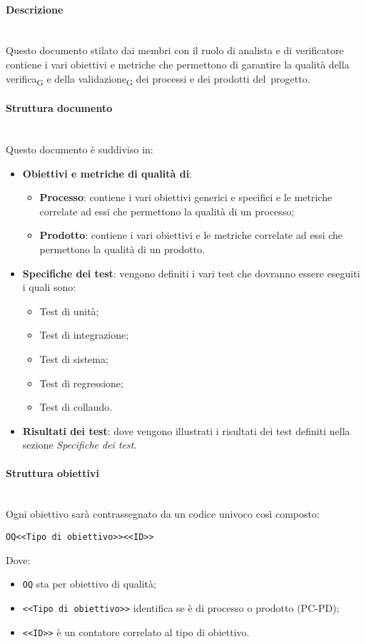 \paragraph {Descrizione}\mbox{}\\
Questo documento stilato dai membri con il ruolo di analista e di verificatore contiene i vari obiettivi e metriche che permettono di garantire la qualità della verifica\textsubscript{G} e della validazione\textsubscript{G} dei processi e dei prodotti del progetto.
\paragraph {Struttura documento}\mbox{}\\
Questo documento è suddiviso in:
\begin{itemize}
	\item \textbf{Obiettivi e metriche di qualità di}:
	\begin{itemize}
		\item \textbf{Processo}: contiene i vari obiettivi generici e specifici e le metriche correlate ad essi che permettono la qualità di un processo;
		\item \textbf{Prodotto}: contiene i vari obiettivi e le metriche correlate ad essi che permettono la qualità di un prodotto.
	\end{itemize}
	\item \textbf{Specifiche dei test}: vengono definiti i vari test che dovranno essere eseguiti i quali sono:
	\begin{itemize}
		\item Test di unità;
		\item Test di integrazione;
		\item Test di sistema;
		\item Test di regressione;
		\item Test di collaudo.
	\end{itemize}
	\item \textbf{Risultati dei test}: dove vengono illustrati i risultati dei test definiti nella sezione \textit{Specifiche dei test}.
\end{itemize} 
\paragraph {Struttura obiettivi}\mbox{}\\
Ogni obiettivo sarà contrassegnato da un codice univoco così composto:
\begin{center}
	\verb|OQ<<Tipo di obiettivo>><<ID>>|
\end{center}
Dove:
\begin{itemize}
	\item \verb|OQ| sta per obiettivo di qualità;
	\item \verb|<<Tipo di obiettivo>>| identifica se è di processo o prodotto (PC-PD);
	\item \verb|<<ID>>| è un contatore correlato al tipo di obiettivo.
\end{itemize}
